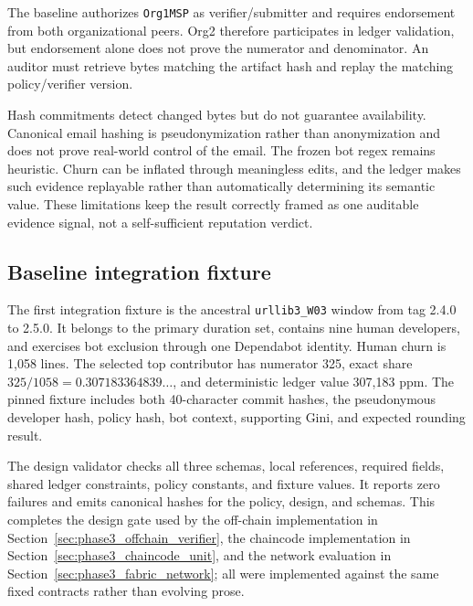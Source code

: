 The baseline authorizes \texttt{Org1MSP} as verifier/submitter and requires endorsement from both organizational peers. Org2
therefore participates in ledger validation, but endorsement alone does not prove the numerator and denominator. An auditor
must retrieve bytes matching the artifact hash and replay the matching policy/verifier version.

Hash commitments detect changed bytes but do not guarantee availability. Canonical email hashing is pseudonymization rather
than anonymization and does not prove real-world control of the email. The frozen bot regex remains heuristic. Churn can be
inflated through meaningless edits, and the ledger makes such evidence replayable rather than automatically determining its
semantic value. These limitations keep the result correctly framed as one auditable evidence signal, not a self-sufficient
reputation verdict.

\subsection{Baseline integration fixture}
\label{sec:phase3_fixture}

The first integration fixture is the ancestral \texttt{urllib3\_W03} window from tag 2.4.0 to 2.5.0. It belongs to the primary
duration set, contains nine human developers, and exercises bot exclusion through one Dependabot identity. Human churn is
1,058 lines. The selected top contributor has numerator 325, exact share $325/1058=0.307183364839\ldots$, and deterministic
ledger value 307,183 ppm. The pinned fixture includes both 40-character commit hashes, the pseudonymous developer hash, policy
hash, bot context, supporting Gini, and expected rounding result.

The design validator checks all three schemas, local references, required fields, shared ledger constraints, policy constants,
and fixture values. It reports zero failures and emits canonical hashes for the policy, design, and schemas. This completes the
design gate used by the off-chain implementation in Section~\ref{sec:phase3_offchain_verifier}, the chaincode implementation
in Section~\ref{sec:phase3_chaincode_unit}, and the network evaluation in Section~\ref{sec:phase3_fabric_network}; all were
implemented against the same fixed contracts rather than evolving prose.
